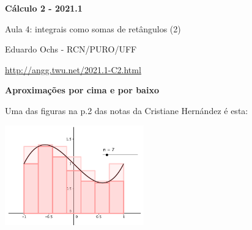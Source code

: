 \documentclass[oneside,12pt]{article}
\begin{document}
\def\Intover #1#2{\overline {∫}_{#1}#2\,dx}
\def\Intunder#1#2{\underline{∫}_{#1}#2\,dx}
\def\Intoverunder#1#2{\Intover{#1}{#2} - \Intunder{#1}{#2}}

\def\Intxover     #1#2#3{\overline {∫}_{x=#1}^{x=#2}#3\,dx}
\def\Intxunder    #1#2#3{\underline{∫}_{x=#1}^{x=#2}#3\,dx}

\def\Intoverunder   #1#2{\overline{\underline{∫}}_{#1}      #2\,dx}
\def\Intxoverunder#1#2#3{\overline{\underline{∫}}_{x=#1}^{x=#2} #3\,dx}


%

\thispagestyle{empty}

\begin{center}

\vspace*{1.2cm}

{\bf \Large Cálculo 2 - 2021.1}

\bsk

Aula 4: integrais como somas de retângulos (2)

\bsk

Eduardo Ochs - RCN/PURO/UFF

\url{http://angg.twu.net/2021.1-C2.html}

\end{center}

\newpage


{\bf Aproximações por cima e por baixo}

Uma das figuras na p.2 das notas da Cristiane Hernández é esta:


\includegraphics[width=6cm]{2020-1-C2/area-hernandez-1.png}
\end{document}
